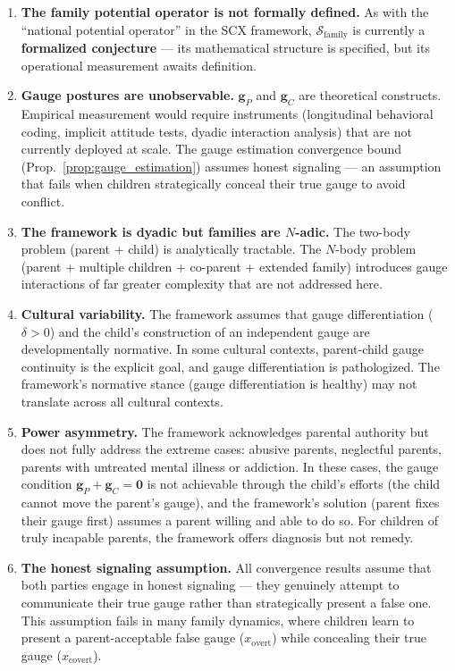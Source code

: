 \documentclass[11pt,a4paper]{article}
\newcommand{\cS}{\mathcal{S}}
\begin{document}
\begin{enumerate}[label=(\arabic*)]
    \item \textbf{The family potential operator is not formally defined.} As with the ``national potential operator'' in the SCX framework, $\cS_{\text{family}}$ is currently a \textbf{formalized conjecture} — its mathematical structure is specified, but its operational measurement awaits definition.

    \item \textbf{Gauge postures are unobservable.} $\mathbf{g}_P$ and $\mathbf{g}_C$ are theoretical constructs. Empirical measurement would require instruments (longitudinal behavioral coding, implicit attitude tests, dyadic interaction analysis) that are not currently deployed at scale. The gauge estimation convergence bound (Prop.~\ref{prop:gauge_estimation}) assumes honest signaling — an assumption that fails when children strategically conceal their true gauge to avoid conflict.

    \item \textbf{The framework is dyadic but families are $N$-adic.} The two-body problem (parent + child) is analytically tractable. The $N$-body problem (parent + multiple children + co-parent + extended family) introduces gauge interactions of far greater complexity that are not addressed here.

    \item \textbf{Cultural variability.} The framework assumes that gauge differentiation ($\delta > 0$) and the child's construction of an independent gauge are developmentally normative. In some cultural contexts, parent-child gauge continuity is the explicit goal, and gauge differentiation is pathologized. The framework's normative stance (gauge differentiation is healthy) may not translate across all cultural contexts.

    \item \textbf{Power asymmetry.} The framework acknowledges parental authority but does not fully address the extreme cases: abusive parents, neglectful parents, parents with untreated mental illness or addiction. In these cases, the gauge condition $\mathbf{g}_P + \mathbf{g}_C = \mathbf{0}$ is not achievable through the child's efforts (the child cannot move the parent's gauge), and the framework's solution (parent fixes their gauge first) assumes a parent willing and able to do so. For children of truly incapable parents, the framework offers diagnosis but not remedy.

    \item \textbf{The honest signaling assumption.} All convergence results assume that both parties engage in honest signaling — they genuinely attempt to communicate their true gauge rather than strategically present a false one. This assumption fails in many family dynamics, where children learn to present a parent-acceptable false gauge ($x_{\text{overt}}$) while concealing their true gauge ($x_{\text{covert}}$).
\end{enumerate}
\end{document}
